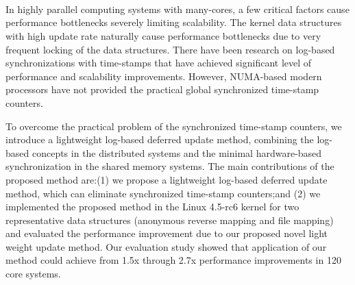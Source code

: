 \documentclass[doctor,korean,final]{kmu}
\begin{document}
\normalsize{
\hfill \break
\begin{center}
\\
\\
\\
\end{center}
\hfill \break

In highly parallel computing systems with many-cores, a few critical factors
cause performance bottlenecks severely limiting scalability.
The kernel data structures with high update rate naturally cause performance
bottlenecks due to very frequent locking of the data structures.
There have been research on log-based synchronizations with time-stamps that
have achieved significant level of performance and scalability improvements.
However, NUMA-based modern processors have not provided the
practical global synchronized time-stamp counters.

To overcome the practical problem of the synchronized time-stamp counters, we
introduce a lightweight log-based deferred update method, combining the
log-based concepts in the distributed systems and the minimal hardware-based
synchronization in the shared memory systems.
The main contributions of the proposed method are:(1) we propose a lightweight
log-based deferred update method, which can eliminate synchronized time-stamp
counters;and (2) we implemented the proposed method in the Linux 4.5-rc6 kernel
for two representative data structures (anonymous reverse mapping and file
mapping) and evaluated the performance improvement due to our proposed novel
light weight update method.
Our evaluation study showed that application of our method could
achieve from 1.5x through 2.7x performance improvements in 120 core
systems.}

\end{document}
